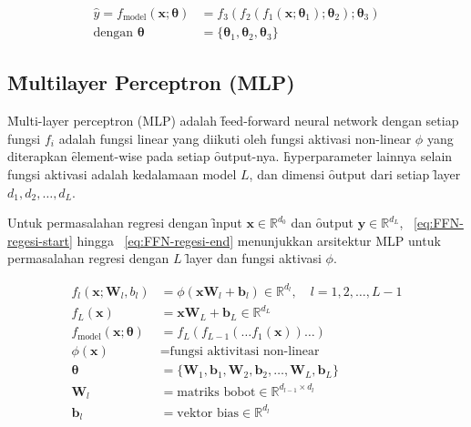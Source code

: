     \begin{align}
        \label{eq:deep-learning-FFN-dag}
        \hat y = f_{\text{model}}(\mathbf{x}; \bm{\theta}) &= f_3(f_2(f_1(\mathbf{x}; \bm{\theta}_1); \bm{\theta}_2); \bm{\theta}_3) \\
        \label{eq:deep-learning-FFN-dag-end}
        \text{dengan } \bm{\theta} &= \{\bm{\theta}_1, \bm{\theta}_2, \bm{\theta}_3\}
    \end{align}

    \subsection{\f{Multilayer Perceptron} (MLP)}

    \f{Multi-layer perceptron} (MLP) adalah \f{feed-forward neural network} dengan setiap fungsi $f_i$ adalah fungsi linear yang diikuti oleh fungsi aktivasi non-linear $\phi$  yang diterapkan \f{element-wise} pada setiap \f{output}-nya. \f{hyperparameter} lainnya selain fungsi aktivasi adalah kedalamaan model $L$, dan dimensi \f{output} dari setiap \f{layer} $d_1, d_2, \dots, d_L$.

    Untuk permasalahan regresi dengan \f{input} $\mathbf{x}\in \mathbb{R}^{d_0}$ dan \f{output} $\mathbf{y} \in \mathbb{R}^{d_L}$, \equ~\ref{eq:FFN-regesi-start} hingga \equ~\ref{eq:FFN-regesi-end} menunjukkan arsitektur MLP untuk permasalahan regresi dengan $L$ \f{layer} dan fungsi aktivasi $\phi$.

    \begin{align}
        \label{eq:FFN-regesi-start}
        f_l(\mathbf{x};\mathbf{W}_l, b_l) &= \phi( \mathbf{x} \mathbf{W}_l + \mathbf{b}_l) \in \mathbb{R}^{d_l}, \quad l = 1, 2, \dots, L-1 \\
        f_L(\mathbf{x}) &= \mathbf{x} \mathbf{W}_L + \mathbf{b}_L \in \mathbb{R}^{d_L} \\
        f_{\text{model}}(\mathbf{x};\bm{\theta}) &= f_L(f_{L-1}(\dots f_1(\mathbf{x})) \dots) \\
        \phi(\mathbf{x}) &= \text{fungsi aktivitasi non-linear} \\
        \bm{\theta} &= \{\mathbf{W}_1, \mathbf{b}_1, \mathbf{W}_2, \mathbf{b}_2, \dots, \mathbf{W}_L, \mathbf{b}_L\} \\
        \mathbf{W}_l &= \text{matriks bobot}  \in \mathbb{R}^{d_{l-1} \times d_l} \\
        \label{eq:FFN-regesi-end}
        \mathbf{b}_l &= \text{vektor bias} \in \mathbb{R}^{d_l}
    \end{align} 

